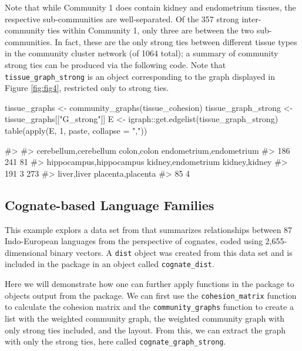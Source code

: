 Note that while Community 1 does contain kidney and endometrium tissues,
the respective sub-communities are well-separated. Of the 357 strong
inter-community ties within Community 1, only three are between the two
sub-communities. In fact, these are the only strong ties between
different tissue types in the community cluster network (of 1064 total);
a summary of community strong ties can be produced via the following
code. Note that \texttt{tissue\_graph\_strong} is an 
object corresponding to the graph displayed in Figure \ref{fig:fig4},
restricted only to strong ties.

\begin{Schunk}
\begin{Sinput}
tissue_graphs <- community_graphs(tissue_cohesion)
tissue_graph_strong <- tissue_graphs[["G_strong"]]
E <- igraph::get.edgelist(tissue_graph_strong)
table(apply(E, 1, paste, collapse = ","))
\end{Sinput}
\begin{Soutput}
#> 
#>   cerebellum,cerebellum             colon,colon endometrium,endometrium 
#>                     186                     241                      81 
#> hippocampus,hippocampus      kidney,endometrium           kidney,kidney 
#>                     191                       3                     273 
#>             liver,liver       placenta,placenta 
#>                      85                       4
\end{Soutput}
\end{Schunk}

\hypertarget{cognate-based-language-families}{%
\subsection{Cognate-based Language
Families}\label{cognate-based-language-families}}

This example explors a data set from \citet{dyen92} that summarizes
relationships between 87 Indo-European languages from the perspective of
cognates, coded using 2,655-dimensional binary vectors. A \texttt{dist}
object was created from this data set and is included in the
 package in an object called \texttt{cognate\_dist}.

Here we will demonstrate how one can further apply functions in the
 package to objects output from the 
package. We can first use the \texttt{cohesion\_matrix} function to
calculate the cohesion matrix and the \texttt{community\_graphs}
function to create a list with the weighted community graph, the
weighted community graph with only strong ties included, and the layout.
From this, we can extract the graph with only the strong ties, here
called \texttt{cognate\_graph\_strong}.

